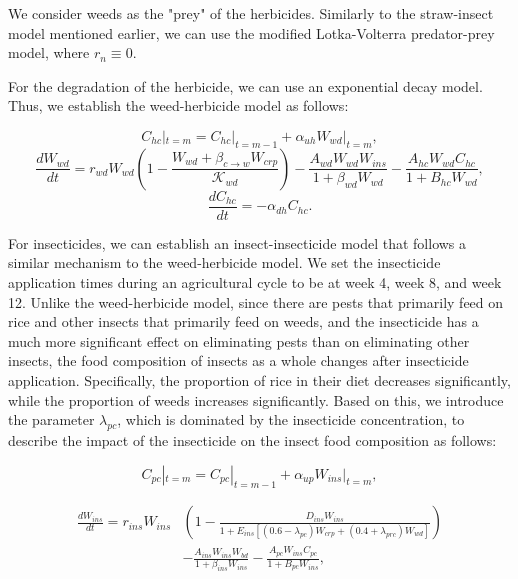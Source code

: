 \documentclass{HZNUMCM}
\begin{document}
        We consider weeds as the "prey" of the herbicides. 
        Similarly to the straw-insect model mentioned earlier, we can use the modified Lotka-Volterra predator-prey model, where \( r_n \equiv 0 \).
      
        For the degradation of the herbicide, we can use an exponential decay model. Thus, we establish the weed-herbicide model as follows:
      
        \begin{equation}
        C_{hc}|_{t=m} = C_{hc}|_{t=m-1} + \alpha_{uh} W_{wd}|_{t=m},
        \end{equation}
        \begin{equation}
        \frac{dW_{wd}}{dt} = r_{wd}W_{wd} \left( 1 - \frac{W_{wd} + \beta_{c \rightarrow w} W_{crp}}{\mathscr{K}_{wd}} \right) - \frac{A_{wd} W_{wd} W_{ins}}{1 + \beta_{wd} W_{wd}} - \frac{A_{hc} W_{wd} C_{hc}}{1 + B_{hc} W_{wd}},
        \end{equation}
        \begin{equation}
        \frac{dC_{hc}}{dt} = - \alpha_{dh} C_{hc}.
        \end{equation}
        
        For insecticides, we can establish an insect-insecticide model that follows a similar mechanism to the weed-herbicide model. 
        We set the insecticide application times during an agricultural cycle to be at week 4, week 8, and week 12. Unlike the weed-herbicide model, 
        since there are pests that primarily feed on rice and other insects that primarily feed on weeds, 
        and the insecticide has a much more significant effect on eliminating pests than on eliminating other insects, 
        the food composition of insects as a whole changes after insecticide application. Specifically, 
        the proportion of rice in their diet decreases significantly, while the proportion of weeds increases significantly. 
        Based on this, we introduce the parameter \( \lambda_{pc} \), which is dominated by the insecticide concentration, 
        to describe the impact of the insecticide on the insect food composition as follows:
        
        \begin{equation}
          C_{pc}|_{t=m} = C_{pc}|_{t=m-1} + \alpha_{up} W_{ins}|_{t=m}, 
        \end{equation}

        \begin{equation}
          \begin{split}
            \frac{dW_{ins}}{dt} = r_{ins} W_{ins} &\left( 1 - \frac{D_{ins} W_{ins}}{1 + E_{ins} \left[ (0.6 - \lambda_{pc}) W_{crp} + (0.4 + \lambda_{prc}) W_{wd} \right]} \right) \\
            &-\frac{A_{ins} W_{ins} W_{bd}}{1 + \beta_{ins} W_{ins}} - \frac{A_{pc} W_{ins} C_{pc}}{1 + B_{pc} W_{ins}},
          \end{split}
      \end{equation}
\end{document}
